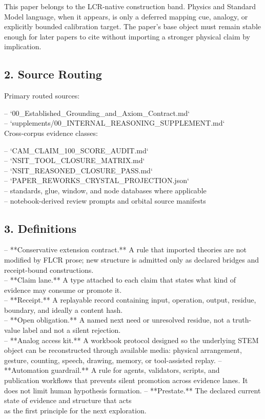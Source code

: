 \documentclass[11pt]{article}
\begin{document}
This paper belongs to the LCR-native construction band. Physics and Standard Model language, when it appears, is only a deferred mapping cue, analogy, or explicitly bounded calibration target. The paper's base object must remain stable enough for later papers to cite without importing a stronger physical claim by implication.

\subsection*{2. Source Routing}

Primary routed sources:

\noindent{}-- `00\_Established\_Grounding\_and\_Axiom\_Contract.md`\\
\noindent{}-- `supplements/00\_INTERNAL\_REASONING\_SUPPLEMENT.md`\\

Cross-corpus evidence classes:

\noindent{}-- `CAM\_CLAIM\_100\_SCORE\_AUDIT.md`\\
\noindent{}-- `NSIT\_TOOL\_CLOSURE\_MATRIX.md`\\
\noindent{}-- `NSIT\_REASONED\_CLOSURE\_PASS.md`\\
\noindent{}-- `PAPER\_REWORKS\_CRYSTAL\_PROJECTION.json`\\
\noindent{}-- standards, glue, window, and node databases where applicable\\
\noindent{}-- notebook-derived review prompts and orbital source manifests\\

\subsection*{3. Definitions}

\noindent{}-- **Conservative extension contract.** A rule that imported theories are not modified by FLCR prose; new structure is admitted only as declared bridges and receipt-bound constructions.\\
\noindent{}-- **Claim lane.** A type attached to each claim that states what kind of evidence may consume or promote it.\\
\noindent{}-- **Receipt.** A replayable record containing input, operation, output, residue, boundary, and ideally a content hash.\\
\noindent{}-- **Open obligation.** A named next need or unresolved residue, not a truth-value label and not a silent rejection.\\
\noindent{}-- **Analog access kit.** A workbook protocol designed so the underlying STEM\\
  object can be reconstructed through available media: physical arrangement,
  gesture, counting, speech, drawing, memory, or tool-assisted replay.
\noindent{}-- **Automation guardrail.** A rule for agents, validators, scripts, and\\
  publication workflows that prevents silent promotion across evidence lanes.
  It does not limit human hypothesis formation.
\noindent{}-- **Prestate.** The declared current state of evidence and structure that acts\\
  as the first principle for the next exploration.
\end{document}
